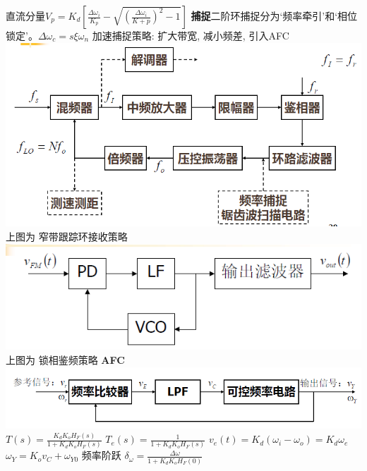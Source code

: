 \documentclass[10.5pt,landscape]{article}
\begin{document}
\begin{multicols*}{4}
 直流分量$V_p = K_d[\frac{\Delta \omega_i}{K_p} - \sqrt{(\frac{\Delta \omega_i}{K+p})^2 - 1}]$ \newline
 \textbf{捕捉}二阶环捕捉分为‘频率牵引’和‘相位锁定’。$\Delta \omega_c = s\xi\omega_n$\newline
 加速捕捉策略: 扩大带宽, 减小频差, 引入AFC \newline
 \includegraphics[scale=0.4]{锁相接收1}\newline
上图为 窄带跟踪环接收策略 \newline
 \includegraphics[scale=0.4]{锁相鉴频}\newline
上图为 锁相鉴频策略 \newline
\textbf{AFC}\newline
 \includegraphics[scale=0.4]{AFC}\newline
 $T(s) = \frac{K_dK_oH_F(s)}{1 +K_dK_oH_F(s)}$ $T_e(s) = \frac{1}{1 +K_dK_oH_F(s)}$ \newline
 $v_e(t) = K_d(\omega_i - \omega_o) = K_d \omega_e$ $\omega_Y = K_o v_C + \omega_{Y0}$ \newline
频率阶跃 $\delta_\omega = \frac{\Delta \omega}{1 + K_dK_oH_F(0)}$\newline

\end{multicols*}
\end{document}
